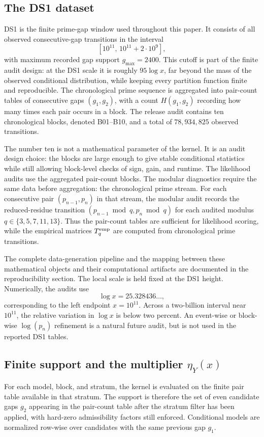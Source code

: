 \documentclass[10pt]{article}
\begin{document}
\subsection{The DS1 dataset}
DS1 is the finite prime-gap window used throughout this paper.  It consists of all observed consecutive-gap transitions in the interval
\[
[10^{11},\,10^{11}+2\cdot 10^9],
\]
with maximum recorded gap support $g_{\max}=2400$.  This cutoff is part of the finite audit design: at the DS1 scale it is roughly $95\log x$, far beyond the mass of the observed conditional distribution, while keeping every partition function finite and reproducible.  The chronological prime sequence is aggregated into pair-count tables of consecutive gaps $(g_1,g_2)$, with a count $H(g_1,g_2)$ recording how many times each pair occurs in a block.  The release audit contains ten chronological blocks, denoted B01--B10, and a total of $78{,}934{,}825$ observed transitions.

The number ten is not a mathematical parameter of the kernel.  It is an audit design choice: the blocks are large enough to give stable conditional statistics while still allowing block-level checks of sign, gain, and runtime.  The likelihood audits use the aggregated pair-count blocks.  The modular diagnostics require the same data before aggregation: the chronological prime stream.  For each consecutive pair $(p_{n-1},p_n)$ in that stream, the modular audit records the reduced-residue transition $(p_{n-1}\bmod q,p_n\bmod q)$ for each audited modulus $q\in\{3,5,7,11,13\}$.  Thus the pair-count tables are sufficient for likelihood scoring, while the empirical matrices $T_q^{\rm emp}$ are computed from chronological prime transitions.

The complete data-generation pipeline and the mapping between these mathematical objects and their computational artifacts are documented in the reproducibility section.  The local scale is held fixed at the DS1 height.  Numerically, the audits use
\[
\log x=25.328436\ldots,
\]
corresponding to the left endpoint $x=10^{11}$.  Across a two-billion interval near $10^{11}$, the relative variation in $\log x$ is below two percent.  An event-wise or block-wise $\log(p_n)$ refinement is a natural future audit, but is not used in the reported DS1 tables.

\subsection{Finite support and the multiplier \(\eta_Y(x)\)}
For each model, block, and stratum, the kernel is evaluated on the finite pair table available in that stratum.  The support is therefore the set of even candidate gaps $g_2$ appearing in the pair-count table after the stratum filter has been applied, with hard-zero admissibility factors still enforced.  Conditional models are normalized row-wise over candidates with the same previous gap $g_1$.
\end{document}
